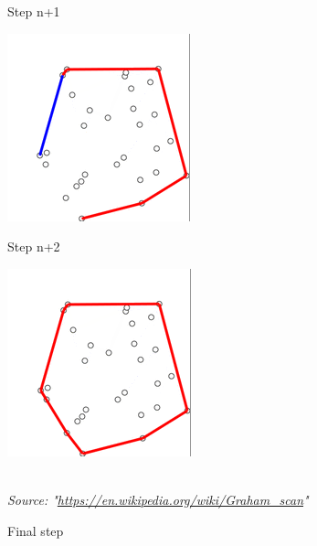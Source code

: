\documentclass[9pt,onecolumn,oneside]{osajnl}
\begin{document}
\begin{figure}[h]
\begin{minipage}[b]{0.18\textwidth}
    \caption{Step n+1}
  \end{minipage}
  \hfill
  \begin{minipage}[b]{0.18\textwidth}
  	\centering
    \includegraphics[width=\textwidth]{3.png}
    \caption{Step n+2}
  \end{minipage}
  \hfill
  \begin{minipage}[b]{0.18\textwidth}
  	\centering
    \includegraphics[width=\textwidth]{4.png}
    \caption{Final step}
  \end{minipage}\\
  \textit{Source: "\url{https://en.wikipedia.org/wiki/Graham_scan}"}
 \end{figure}
\end{document}
